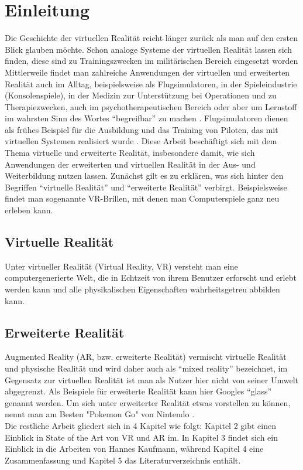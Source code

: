 \documentclass[deutsch]{llncs}
\begin{document}
\tableofcontents
\newpage
{}
\section{Einleitung}
\label{sec:intro}
Die Geschichte der virtuellen Realität reicht länger zurück als man auf den ersten Blick glauben möchte. Schon analoge Systeme der virtuellen Realität lassen sich finden, diese sind zu Trainingszwecken im militärischen Bereich eingesetzt worden \cite{vrnerds}
Mittlerweile findet man zahlreiche Anwendungen der virtuellen und erweiterten Realität auch im Alltag, beispielsweise als Flugsimulatoren, in der Spieleindustrie (Konsolenspiele), in der Medizin zur Unterstützung bei Operationen und zu Therapiezwecken, auch im psychotherapeutischen Bereich oder aber um Lernstoff im wahrsten Sinn des Wortes ``begreifbar'' zu machen \cite{Klampfer}. 
Flugsimulatoren dienen als frühes Beispiel für die Ausbildung und das Training von Piloten, das mit virtuellen Systemen realisiert wurde  \cite{Klampfer}.
Diese Arbeit beschäftigt sich mit dem Thema virtuelle und erweiterte Realität, insbesondere damit, wie sich Anwendungen der erweiterten und virtuellen Realität in der Aus- und Weiterbildung nutzen lassen. 
Zunächst gilt es zu erklären, was sich hinter den Begriffen ``virtuelle Realität'' und ``erweiterte Realität'' verbirgt. 
Beispielsweise findet man sogenannte VR-Brillen, mit denen man Computerspiele ganz neu erleben kann.

\subsection{Virtuelle Realität}
\label{sec:typo}
Unter virtueller Realität (Virtual Reality, VR) versteht man eine computergenerierte Welt, die in Echtzeit von ihrem Benutzer erforscht und erlebt werden kann und alle physikalischen Eigenschaften wahrheitsgetreu abbilden kann. 
\subsection{Erweiterte Realität}

Augmented Reality (AR, bzw. erweiterte Realität) vermischt virtuelle Realität und physische Realität und wird daher auch als ``mixed reality'' bezeichnet, im Gegensatz zur virtuellen Realität ist man als Nutzer hier nicht von seiner Umwelt abgegrenzt.
Als Beispiele für erweiterte Realität kann hier Googles ``glass'' genannt werden. 
Um sich unter erweiterter Realität etwas vorstellen zu können, nennt man am Besten "Pokemon Go"  von Nintendo \cite{Klampfer}.
\noindent \\
Die restliche Arbeit gliedert sich in 4 Kapitel wie folgt: 
Kapitel 2 gibt einen Einblick in State of the Art von VR und AR im. In Kapitel 3 findet sich ein Einblick in die Arbeiten von Hannes Kaufmann, während Kapitel 4 eine Zusammenfassung und Kapitel 5 das Literaturverzeichnis enthält.
\end{document}
